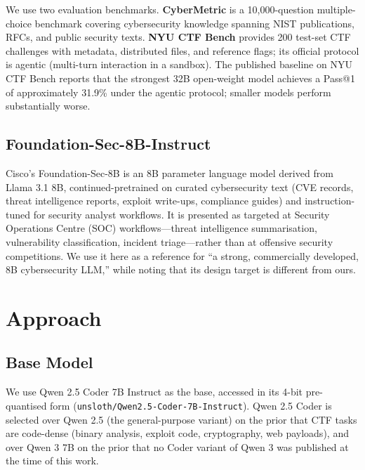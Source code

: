 \documentclass[10pt,twocolumn,a4paper]{article}
\begin{document}
We use two evaluation benchmarks. \textbf{CyberMetric} \cite{tihanyi2024cybermetric} is a 10{,}000-question multiple-choice benchmark covering cybersecurity knowledge spanning NIST publications, RFCs, and public security texts. \textbf{NYU CTF Bench} \cite{shao2024nyuctf} provides 200 test-set CTF challenges with metadata, distributed files, and reference flags; its official protocol is agentic (multi-turn interaction in a sandbox). The published baseline on NYU CTF Bench reports that the strongest 32B open-weight model achieves a Pass@1 of approximately 31.9\% under the agentic protocol; smaller models perform substantially worse.

\subsection{Foundation-Sec-8B-Instruct}

Cisco's Foundation-Sec-8B \cite{cisco2025foundationsec} is an 8B parameter language model derived from Llama 3.1 8B, continued-pretrained on curated cybersecurity text (CVE records, threat intelligence reports, exploit write-ups, compliance guides) and instruction-tuned for security analyst workflows. It is presented as targeted at Security Operations Centre (SOC) workflows---threat intelligence summarisation, vulnerability classification, incident triage---rather than at offensive security competitions. We use it here as a reference for ``a strong, commercially developed, 8B cybersecurity LLM,'' while noting that its design target is different from ours.

\section{Approach}

\subsection{Base Model}

We use Qwen 2.5 Coder 7B Instruct \cite{hui2024qwen25coder} as the base, accessed in its 4-bit pre-quantised form (\texttt{unsloth/Qwen2.5-Coder-7B-Instruct}). Qwen 2.5 Coder is selected over Qwen 2.5 (the general-purpose variant) on the prior that CTF tasks are code-dense (binary analysis, exploit code, cryptography, web payloads), and over Qwen 3 7B on the prior that no Coder variant of Qwen 3 was published at the time of this work.
\end{document}
